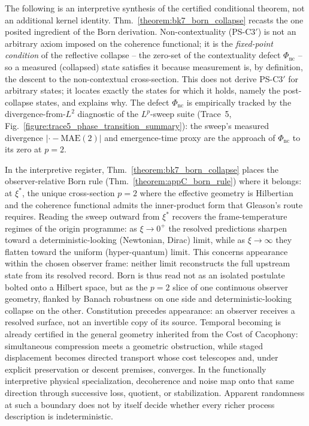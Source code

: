 \begin{remark}
\label{remark:bk7_born_collapse_psc3prime}
The following is an interpretive synthesis of the certified conditional theorem, not
an additional kernel identity. Thm.~\ref{theorem:bk7_born_collapse} recasts the one
posited ingredient of the Born
derivation. Non-contextuality (PS-C3$'$) is not an arbitrary axiom imposed on the
coherence functional; it is the \emph{fixed-point condition} of the reflective
collapse -- the zero-set of the contextuality defect $\Phi_{\mathrm{nc}}$ -- so a
measured (collapsed) state satisfies it because measurement is, by definition, the
descent to the non-contextual cross-section. This does not derive PS-C3$'$ for
arbitrary states; it locates exactly the states for which it holds, namely the
post-collapse states, and explains why. The defect $\Phi_{\mathrm{nc}}$ is empirically
tracked by the divergence-from-$L^{2}$ diagnostic of the $L^{p}$-sweep suite
(Trace~5, Fig.~\ref{figure:trace5_phase_transition_summary}): the sweep's measured
divergence $|{\cdot}-\text{MAE}(2)|$ and emergence-time proxy are the approach of
$\Phi_{\mathrm{nc}}$ to its zero at $p=2$.
\end{remark}

\begin{scholium}
\label{scholium:bk7_born_as_hilbert_cross_section}
In the interpretive register, Thm.~\ref{theorem:bk7_born_collapse} places the observer-relative Born rule
(Thm.~\ref{theorem:appC_born_rule}) where it belongs: at $\xi^{\ast}$, the unique
cross-section $p=2$ where the effective geometry is Hilbertian and the coherence
functional admits the inner-product form that Gleason's route requires. Reading the
sweep outward from $\xi^{\ast}$ recovers the frame-temperature regimes of the
origin programme: as $\xi\to 0^{+}$ the resolved predictions sharpen toward a
deterministic-looking (Newtonian, Dirac) limit, while as $\xi\to\infty$ they flatten
toward the uniform (hyper-quantum) limit. This concerns appearance within the chosen
observer frame: neither limit reconstructs the full upstream state from its resolved
record. Born is thus read not as an isolated postulate bolted onto a Hilbert space,
but as the $p=2$ slice of one continuous observer geometry, flanked by Banach
robustness on one side and deterministic-looking collapse on the other.
Constitution precedes appearance: an observer receives a resolved surface, not an
invertible copy of its source.  Temporal becoming is already certified in the general
geometry inherited from the Cost of Cacophony: simultaneous compression meets a
geometric obstruction, while staged displacement becomes directed transport whose
cost telescopes and, under explicit preservation or descent premises, converges.
In the functionally interpretive physical specialization, decoherence and noise map onto that same
direction through successive loss, quotient, or stabilization.  Apparent randomness
at such a boundary does not by itself decide whether every richer process description
is indeterministic.
\end{scholium}

